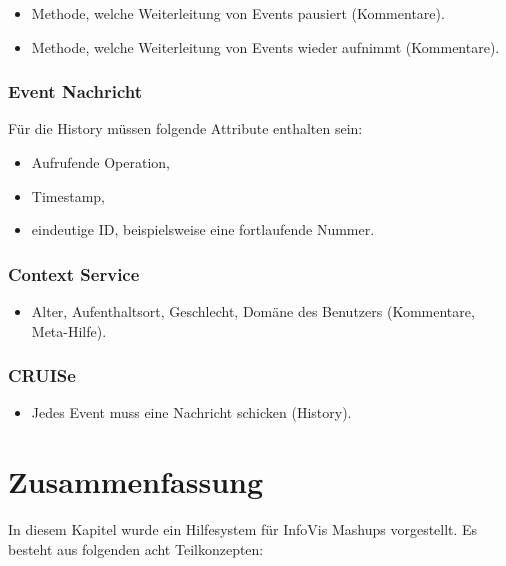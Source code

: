 \documentclass[
	headsepline,
	footsepline,
	fontsize=12pt,
	bibliography=totoc
]{scrbook}
\begin{document}
\begin{itemize}
	\item Methode, welche Weiterleitung von Events pausiert (Kommentare).
	\item Methode, welche Weiterleitung von Events wieder aufnimmt (Kommentare).
\end{itemize}

\subsubsection{Event Nachricht}

Für die History müssen folgende Attribute enthalten sein:

\begin{itemize}
	\item Aufrufende Operation,
	\item Timestamp,
	\item eindeutige ID, beispielsweise eine fortlaufende Nummer.
\end{itemize}

\subsubsection{Context Service}

\begin{itemize}
	\item Alter, Aufenthaltsort, Geschlecht, Domäne des Benutzers (Kommentare, Meta-Hilfe).
\end{itemize}

\subsubsection{CRUISe}

\begin{itemize}
	\item Jedes Event muss eine Nachricht schicken (History).
\end{itemize}

\section{Zusammenfassung}
\label{section:konzeption:zusammenfassung}

In diesem Kapitel wurde ein Hilfesystem für InfoVis Mashups vorgestellt. Es besteht aus folgenden acht Teilkonzepten:
\end{document}

